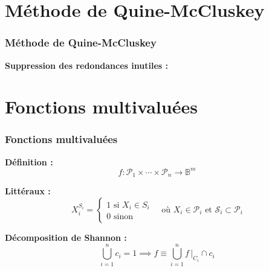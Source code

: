 \documentclass[handout]{beamer}
\begin{document}
\section{Méthode de Quine-McCluskey}
\begin{frame}
  \frametitle{Méthode de Quine-McCluskey}
  
  \textbf{Suppression des redondances inutiles : }
  
  \begin{tikzpicture}[scale=2]
  
  \end{tikzpicture}  
  
  
%  
%    
%
%
\end{frame}

\section{Fonctions multivaluées}
\begin{frame}
  \frametitle{Fonctions multivaluées}

  \textbf{Définition :}
  \[ f: \mathcal{P}_1 \times \cdots \times \mathcal{P}_n \longrightarrow \mathbb{B}^m \]

  \textbf{Littéraux :} 
  \[X_i^{S_i} = %
  \begin{cases}
    1 \text{ si } X_i \in S_i \\
    0 \text{ sinon}
  \end{cases}
  \quad \text{où } X_i \in \mathcal{P}_i \text{ et } \mathcal{S}_i \subset \mathcal{P}_i \]

  \textbf{Décomposition de Shannon :}
  \[ \bigcup_{i=1}^n c_i = 1 \implies f \equiv \bigcup_{i=1}^{n} f\,|_{C_i} \cap c_i \]

\end{frame}
\end{document}
